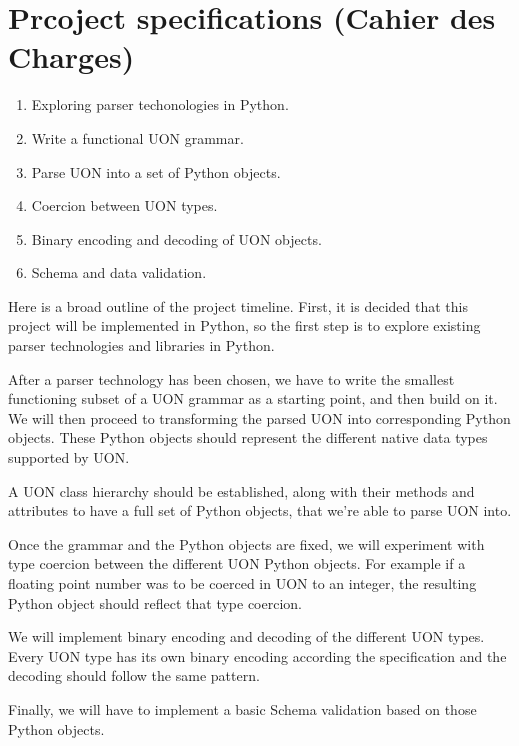 \documentclass[12pt]{article}
\begin{document}
\section{Prcoject specifications (Cahier des Charges)}
\begin{enumerate}
    \item Exploring parser techonologies in Python.
    \item Write a functional UON grammar.
    \item Parse UON into a set of Python objects.
    \item Coercion between UON types.
    \item Binary encoding and decoding of UON objects.
    \item Schema and data validation.
\end{enumerate}

Here is a broad outline of the project timeline. First, it is decided that this project will be implemented in Python, so the first step is to explore existing parser technologies and libraries in Python.

After a parser technology has been chosen, we have to write the smallest functioning subset of a UON grammar as a starting point, and then build on it. We will then proceed to transforming the parsed UON into corresponding Python objects. These Python objects should represent the different native data types supported by UON. 

A UON class hierarchy should be established, along with their methods and attributes to have a full set of Python objects, that we're able to parse UON into.

Once the grammar and the Python objects are fixed, we will experiment with type coercion between the different UON Python objects. For example if a floating point number was to be coerced in UON to an integer, the resulting Python object should reflect that type coercion.

We will implement binary encoding and decoding of the different UON types. Every UON type has its own binary encoding according the specification and the decoding should follow the same pattern.

Finally, we will have to implement a basic Schema validation based on those Python objects.

\pagebreak

\tableofcontents
\pagebreak
\end{document}
